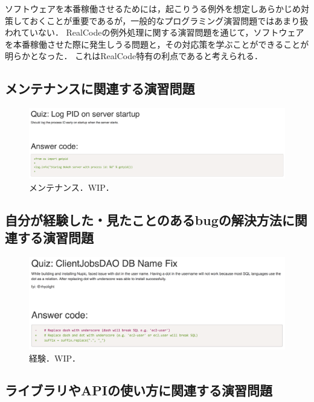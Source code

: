 ソフトウェアを本番稼働させるためには，起こりうる例外を想定しあらかじめ対策しておくことが重要であるが，一般的なプログラミング演習問題ではあまり扱われていない．
RealCodeの例外処理に関する演習問題を通じて，ソフトウェアを本番稼働させた際に発生しうる問題と，その対応策を学ぶことができることが明らかとなった．
これはRealCode特有の利点であると考えられる．

\subsection{メンテナンスに関連する演習問題}

\begin{figure}[t]
	\centering
  \includegraphics[width=1.0\columnwidth]{20190107-lab-study-maintenance-exercise.png}
  \caption{メンテナンス．WIP．}
  \label{fig:lab-study-eg-maintenance}
\end{figure}

\subsection{自分が経験した・見たことのあるbugの解決方法に関連する演習問題}

\begin{figure}[t]
	\centering
  \includegraphics[width=1.0\columnwidth]{20190107-lab-study-experience-exercise.png}
  \caption{経験．WIP．}
  \label{fig:lab-study-eg-experience}
\end{figure}

\subsection{ライブラリやAPIの使い方に関連する演習問題}

